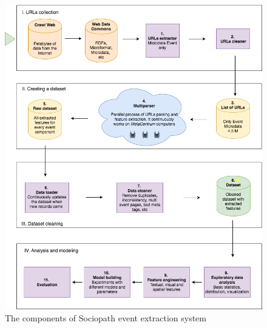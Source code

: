\begin{figure}[h]
\begin{center}
\includegraphics[width=1.0\textwidth]{figures03/Architecure}
\caption{The components of Sociopath event extraction system}
\label{fig:architecture}
\end{center}
\end{figure}
